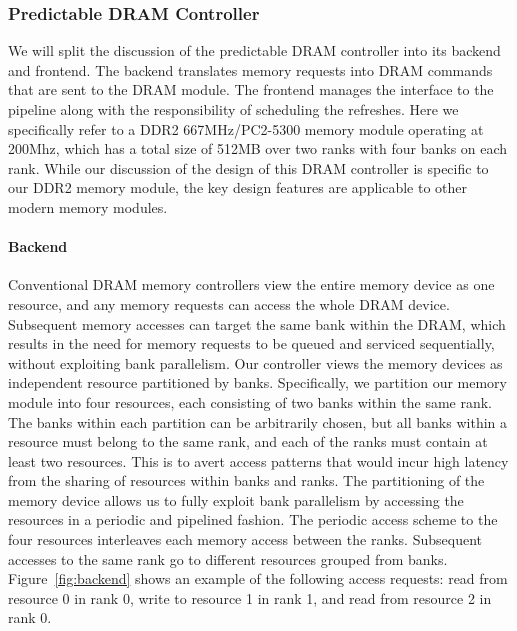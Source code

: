 \subsubsection{Predictable DRAM Controller}
\label{sec:pret_dram_controller}
We will split the discussion of the predictable DRAM controller into its backend and frontend. 
The backend translates memory requests into DRAM commands that are sent to the DRAM module.
The frontend manages the interface to the pipeline along with the responsibility of scheduling the refreshes.
Here we specifically refer to a DDR2 667MHz/PC2-5300 memory module operating at 200Mhz, which has a total size of 512MB over two ranks with four banks on each rank.
While our discussion of the design of this DRAM controller is specific to our DDR2 memory module, the key design features are applicable to other modern memory modules.

\paragraph{Backend}
Conventional DRAM memory controllers view the entire memory device as one resource, and any memory requests can access the whole DRAM device. 
Subsequent memory accesses can target the same bank within the DRAM, which results in the need for memory requests to be queued and serviced sequentially, without exploiting bank parallelism.
Our controller views the memory devices as independent resource partitioned by banks. 
Specifically, we partition our memory module into four resources, each consisting of two banks within the same rank. 
The banks within each partition can be arbitrarily chosen, but all banks within a resource must belong to the same rank, and each of the ranks must contain at least two resources.
This is to avert access patterns that would incur high latency from the sharing of resources within banks and ranks.
The partitioning of the memory device allows us to fully exploit bank parallelism by accessing the resources in a periodic and pipelined fashion.
The periodic access scheme to the four resources interleaves each memory access between the ranks.
Subsequent accesses to the same rank go to different resources grouped from banks.  
Figure~\ref{fig:backend} shows an example of the following access requests: read from resource 0 in rank 0, write to resource 1 in rank 1, and read from resource 2 in rank 0. 


